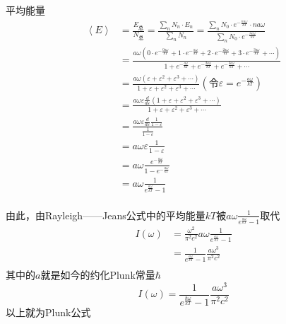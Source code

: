 \documentclass[lang=cn,10pt]{elegantbook}
\begin{document}
平均能量\begin{equation}
	\begin{split}
		\left< E \right> &=\frac{E_{\text{总}}}{N_{\text{总}}}=\frac{\sum_n{N_n\cdot E_n}}{\sum_n{N_n}}=\frac{\sum_n{N_0\cdot e^{-\frac{na\omega}{kT}}\cdot na\omega}}{\sum_n{N_0\cdot e^{-\frac{na\omega}{kT}}}}
		\\
		&=\frac{a\omega \left( 0\cdot e^{-\frac{0a\omega}{kT}}+1\cdot e^{-\frac{a\omega}{kT}}+2\cdot e^{-\frac{2a\omega}{kT}}+3\cdot e^{-\frac{3a\omega}{kT}}+\cdots \right)}{1+e^{-\frac{a\omega}{kT}}+e^{-\frac{2a\omega}{kT}}+e^{-\frac{3a\omega}{kT}}+\cdots}
		\\
		&=\frac{a\omega \left( \varepsilon +\varepsilon ^2+\varepsilon ^3+\cdots \right)}{1+\varepsilon +\varepsilon ^2+\varepsilon ^3+\cdots}\left( \text{令}\varepsilon =e^{-\frac{a\omega}{kT}} \right) 
		\\
		&=\frac{a\omega \varepsilon \frac{d}{d\varepsilon}\left( 1+\varepsilon +\varepsilon ^2+\varepsilon ^3+\cdots \right)}{1+\varepsilon +\varepsilon ^2+\varepsilon ^3+\cdots}
		\\
		&=\frac{a\omega \varepsilon \frac{d}{d\varepsilon}\frac{1}{1-\varepsilon}}{\frac{1}{1-\varepsilon}}
		\\
		&=a\omega \varepsilon \frac{1}{1-\varepsilon}
		\\
		&=a\omega \frac{e^{-\frac{a\omega}{kT}}}{1-e^{-\frac{a\omega}{kT}}}
		\\
		&=a\omega \frac{1}{e^{\frac{a\omega}{kT}}-1}
		\\
	\end{split}
\end{equation}

由此，由Rayleigh——Jeans公式中的平均能量$kT$被$a\omega \frac{1}{e^{\frac{a\omega}{kT}}-1}$取代
\begin{equation}
	\begin{split}
		I\left( \omega \right) &=\frac{\omega ^2}{\pi ^2c^2}a\omega \frac{1}{e^{\frac{a\omega}{kT}}-1}
		\\
		&=\frac{1}{e^{\frac{a\omega}{kT}}-1}\frac{a\omega ^3}{\pi ^2c^2}
		\\
	\end{split}
\end{equation}
其中的$a$就是如今的约化Plunk常量$\hbar $
\begin{equation}
		I\left( \omega \right)=\frac{1}{e^{\frac{\hbar\omega}{kT}}-1}\frac{a\omega ^3}{\pi ^2c^2}
\end{equation}
以上就为Plunk公式
\end{document}
